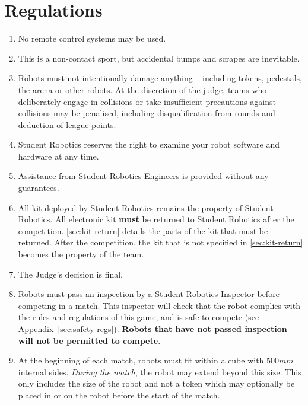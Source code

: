 \section {Regulations}
\label{sec:Regulations}

\begin{enumerate}


\item No remote control systems may be used.
\item This is a non-contact sport, but accidental bumps and scrapes are inevitable.
\item Robots must not intentionally damage anything -- including tokens, pedestals, the arena or other robots. At the discretion of the judge, teams who deliberately engage in collisions or take insufficient precautions against collisions may be penalised, including disqualification from rounds and deduction of league points.
\item Student Robotics reserves the right to examine your robot software and hardware at any time.
\item Assistance from Student Robotics Engineers is provided without any guarantees.
\item All kit deployed by Student Robotics remains the property of Student Robotics.
      All electronic kit \textbf{must} be returned to Student Robotics after the competition.
      \autoref{sec:kit-return} details the parts of the kit that must be returned.
      After the competition, the kit that is not specified in \autoref{sec:kit-return} becomes the property of the team.

\item The Judge's decision is final.


\item Robots must pass an inspection by a Student Robotics Inspector before competing in a match.
      This inspector will check that the robot complies with the rules and regulations of this game, and is safe to compete (see Appendix~\ref{sec:safety-regs}).
      \textbf{Robots that have not passed inspection will not be permitted to compete}.

\item At the beginning of each match, robots must fit within a cube with $500mm$ internal sides.
      \textit{During the match}, the robot may extend beyond this size. This only includes the size of the robot and not a token which may optionally be placed in or on the robot before the start of the match. 


\end{enumerate}
